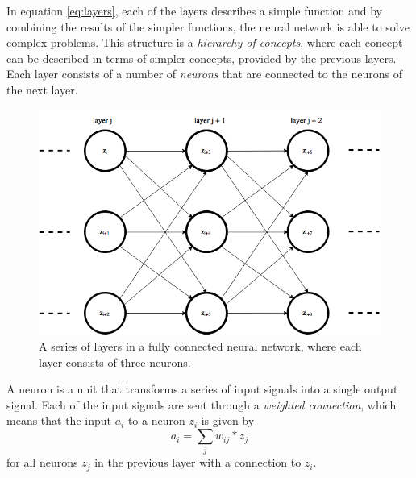 \documentclass[11pt]{article}
\begin{document}
In equation \ref{eq:layers}, each of the layers describes a simple function
and by combining the results of the simpler functions, the neural network
is able to solve complex problems.
This structure is a \textit{hierarchy of concepts}, where each concept can be described in terms
of simpler concepts, provided by the previous layers.
Each layer consists of a number of \textit{neurons} that are connected to the
neurons of the next layer.
\begin{figure}[!h]
    \centering
    \includegraphics[width=12cm]{include/layers.png}
    \caption{A series of layers in a fully connected neural network, where each layer consists of three neurons.}
    \label{fig:layers}
\end{figure}

A neuron is a unit that transforms a series of input signals into a single output signal.
Each of the input signals are sent through a \textit{weighted connection}, which means
that the input $a_i$ to a neuron $z_i$ is given by
\begin{equation}
    a_i = \sum\limits_{j} w_{ij}* z_j
\end{equation}
for all neurons $z_j$ in the previous layer with a connection to $z_i$.
\end{document}
